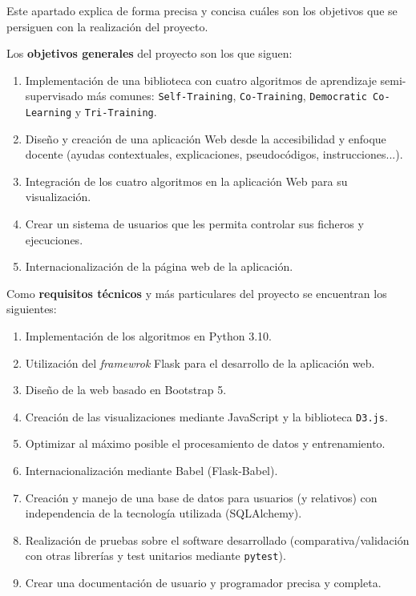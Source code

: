 
Este apartado explica de forma precisa y concisa cuáles son los objetivos que se
persiguen con la realización del proyecto.


Los \textbf{objetivos generales} del proyecto son los que siguen:
\begin{enumerate}
    \item Implementación de una biblioteca con cuatro algoritmos de aprendizaje
    semi-supervisado más comunes: \texttt{Self-Training}, \texttt{Co-Training},
    \texttt{Democratic Co-Learning} y \texttt{Tri-Training}.
    \item Diseño y creación de una aplicación Web desde la accesibilidad y
    enfoque docente (ayudas contextuales, explicaciones, pseudocódigos,
    instrucciones...).
    \item Integración de los cuatro algoritmos en la aplicación Web para su
    visualización.
    \item Crear un sistema de usuarios que les permita controlar sus ficheros y ejecuciones.
    \item Internacionalización de la página web de la aplicación.
\end{enumerate}

Como \textbf{requisitos técnicos} y más particulares del proyecto se encuentran
los siguientes:

\begin{enumerate}
    \item Implementación de los algoritmos en Python 3.10.
    \item Utilización del \emph{framewrok} Flask para el desarrollo de la
    aplicación web.
    \item Diseño de la web basado en Bootstrap 5.
    \item Creación de las visualizaciones mediante JavaScript y la biblioteca
    \texttt{D3.js}.
    \item Optimizar al máximo posible el procesamiento de datos y entrenamiento.
    \item Internacionalización mediante Babel (Flask-Babel).
    \item Creación y manejo de una base de datos para usuarios (y relativos) con
    independencia de la tecnología utilizada (SQLAlchemy).
    \item Realización de pruebas sobre el software desarrollado
    (comparativa/validación con otras librerías y test unitarios mediante
    \texttt{pytest}).
    \item Crear una documentación de usuario y programador precisa y completa.
\end{enumerate}